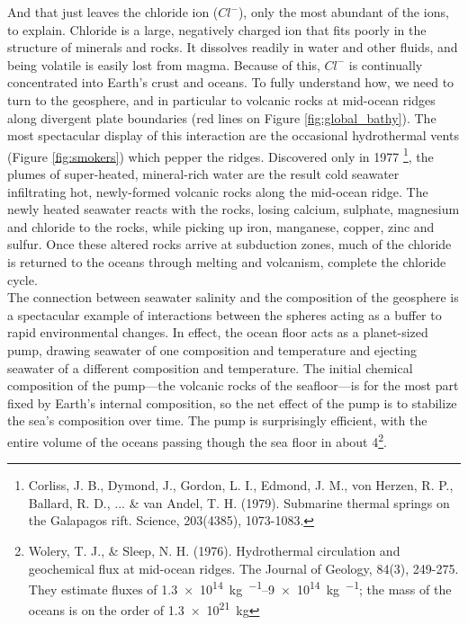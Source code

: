 And that just leaves the chloride ion ($Cl^-$), only the most abundant of the ions, to explain. Chloride is a large, negatively charged ion that fits poorly in the structure of minerals and rocks. It dissolves readily in water and other fluids, and being volatile is easily lost from magma. Because of this, $Cl^-$ is continually concentrated into Earth's crust and oceans. To fully understand how, we need to turn to the geosphere, and in particular to volcanic rocks at mid-ocean ridges along divergent plate boundaries (red lines on Figure \ref{fig:global_bathy}). The most spectacular display of this interaction are the occasional hydrothermal vents (Figure \ref{fig:smokers}) which pepper the ridges. Discovered only in 1977 \footnote{Corliss, J. B., Dymond, J., Gordon, L. I., Edmond, J. M., von Herzen, R. P., Ballard, R. D., ... \& van Andel, T. H. (1979). Submarine thermal springs on the Galapagos rift. Science, 203(4385), 1073-1083.}, the plumes of super-heated, mineral-rich water are the result cold seawater infiltrating hot, newly-formed volcanic rocks along the mid-ocean ridge. The newly heated seawater reacts with the rocks, losing calcium, sulphate, magnesium and chloride to the rocks, while picking up iron, manganese, copper, zinc and sulfur. Once these altered rocks arrive at subduction zones, much of the chloride is returned to the oceans through melting and volcanism, complete the chloride cycle.\\

The connection between seawater salinity and the composition of the geosphere is a spectacular example of interactions between the spheres acting as a buffer to rapid environmental changes. In effect, the ocean floor acts as a planet-sized pump, drawing seawater of one composition and temperature and ejecting seawater of a different composition and temperature. The initial chemical composition of the pump---the volcanic rocks of the seafloor---is for the most part fixed by Earth's internal composition, so the net effect of the pump is to stabilize the sea's composition over time. The pump is surprisingly efficient, with the entire volume of the oceans passing though the sea floor in about \SI{4}{\ma}\footnote{Wolery, T. J., \& Sleep, N. H. (1976). Hydrothermal circulation and geochemical flux at mid-ocean ridges. The Journal of Geology, 84(3), 249-275. They estimate fluxes of \SIrange{1.3e14}{9e14}{\kg\per\year}; the mass of the oceans is on the order of \SI{1.3e21}{\kg}}.   \\

